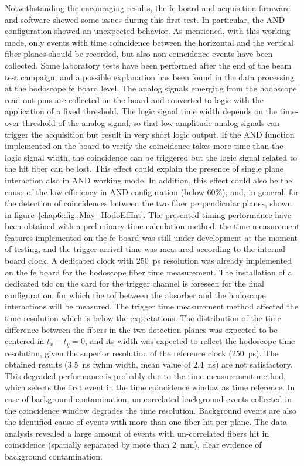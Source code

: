 Notwithstanding the encouraging results, the \gls{fe} board and acquisition firmware and software showed some issues during this first test. In particular, the AND configuration showed an unexpected behavior. As mentioned, with this working mode, only events with time coincidence between the horizontal and the vertical fiber planes should be recorded, but also non-coincidence events have been collected. 
Some laboratory tests have been performed after the end of the beam test campaign, and a possible explanation has been found in the data processing at the hodoscope \gls{fe} board level. The analog signals emerging from the hodoscope read-out \glspl{pm} are collected on the board and converted to logic with the application of a fixed threshold. The logic signal time width depends on the time-over-threshold of the analog signal, so that low amplitude analog signals can trigger the acquisition but result in very short logic output. If the AND function implemented on the board to verify the coincidence takes more time than the logic signal width, the coincidence can be triggered but the logic signal related to the hit fiber can be lost. 
This effect could explain the presence of single plane interaction also in AND working mode. In addition, this effect could also be the cause of the low efficiency in AND configuration (below 60\%), and, in general, for the detection of coincidences between the two fiber perpendicular planes, shown in figure~\ref{chap6::fig::May_HodoEffInt}. 
The presented timing performance have been obtained with a preliminary time calculation method. the time measurement features implemented on the \gls{fe} board was still under development at the moment of testing, and the trigger arrival time was measured according to the internal board clock. A dedicated clock with 250~ps resolution was already implemented on the \gls{fe} board for the hodoscope fiber time measurement. The installation of a dedicated \gls{tdc} on the card for the trigger channel is foreseen for the final configuration, for which the \gls{tof} between the absorber and the hodoscope interactions will be measured. The trigger time measurement method affected the time resolution which is below the expectations. The distribution of the time difference between the fibers in the two detection planes was expected to be centered in $t_{x}-t_{y} = 0$, and its width was expected to reflect the hodoscope time resolution, given the superior resolution of the reference clock (250~ps). The obtained results (3.5~ns \gls{fwhm} width, mean value of 2.4~ns) are not satisfactory. This degraded performance is probably due to the time measurement method, which selects the first event in the time coincidence window as time reference. In case of background contamination, un-correlated background events collected in the coincidence window degrades the time resolution. Background events are also the identified cause of events with more than one fiber hit per plane. The data analysis revealed a large amount of events with un-correlated fibers hit in coincidence (spatially separated by more than 2~mm), clear evidence of background contamination.
